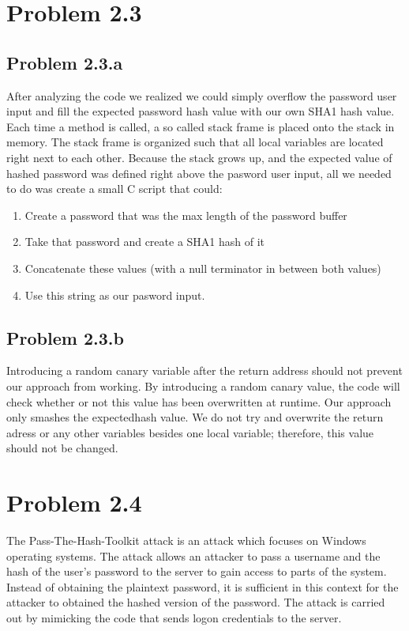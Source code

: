 \documentclass[psamsfonts]{amsart}
\begin{document}
 \section{Problem 2.3}

 \subsection{Problem 2.3.a}
 After analyzing the code we realized we could simply overflow the password user input and fill the expected password hash value with our own SHA1 hash value.  Each time a method is called, a so called stack frame is placed onto the stack in memory.  The stack frame is organized such that all local variables are located right next to each other.  Because the stack grows up, and the expected value of hashed password was defined right above the pasword user input, all we needed to do was create a small C script that could:

     \begin{enumerate}[(1)]
       \item Create a password that was the max length of the password buffer
       \item Take that password and create a SHA1 hash of it
       \item Concatenate these values (with a null terminator in between both values)
       \item Use this string as our pasword input.
     \end{enumerate}

 \subsection{Problem 2.3.b}
    Introducing a random canary variable after the return address should not prevent our approach from working.  By introducing a random canary value, the code will check whether or not this value has been overwritten at runtime.  Our approach only smashes the expectedhash value.  We do not try and overwrite the return adress or any other variables besides one local variable; therefore, this value should not be changed.

\section{Problem 2.4}

The Pass-The-Hash-Toolkit attack is an attack which focuses on Windows operating systems. The attack allows an attacker to pass a username and the hash of the user's password to the server to gain access to parts of the system. Instead of obtaining the plaintext password, it is sufficient in this context for the attacker to obtained the hashed version of the password. The attack is carried out by mimicking the code that sends logon credentials to the server.
\end{document}
